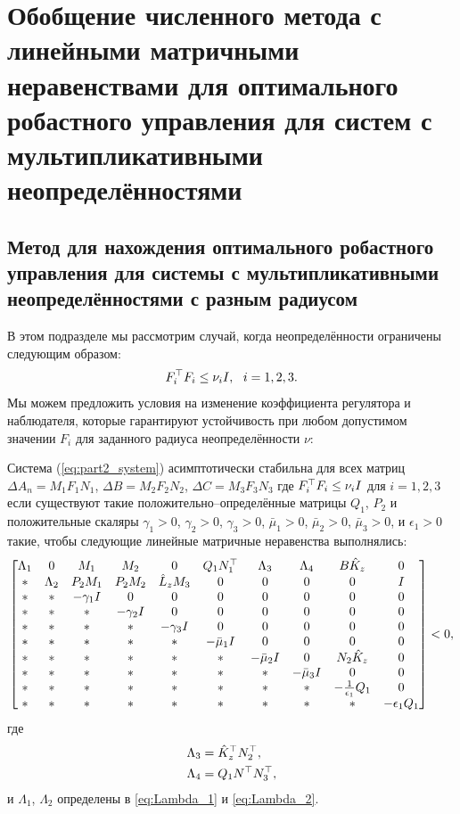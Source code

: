 \chapter{Обобщение численного метода с линейными матричными неравенствами для оптимального робастного управления для систем с мультипликативными неопределённостями}\label{ch:ch4}
\section{Метод для нахождения оптимального робастного управления для системы с мультипликативными неопределённостями с разным радиусом}\label{sec:ch4/sect1}

В этом подразделе мы рассмотрим случай, когда неопределённости ограничены следующим образом:
%
\begin{equation}
	\label{eq:part2_nu_uncertainty}
	{F}_i^\top{F}_i\leq \nu_i {I}, \ \ i=1,2,3.
\end{equation}
%
Мы можем предложить условия на изменение коэффициента регулятора и наблюдателя, которые гарантируют устойчивость при любом допустимом значении ${F}_i$ для заданного радиуса неопределённости $\nu$:
\begin{theorem}\label{thm:part2_LMI_2}
	Система (\ref{eq:part2_system}) асимптотически стабильна для всех матриц
	$\Delta {A}_n={M}_1{F}_1{N}_1$, 
	$\Delta {B}= {M}_2{F}_2{N}_2$, 
	$\Delta {C} = {M}_3{F}_3{N}_3$
	где
	${F}_i^\top{F}_i\leq \nu_i {I}$ для $i=1,2,3$
	если существуют такие положительно--определённые матрицы ${Q}_1$, ${P}_2$ и положительные скаляры
	$\gamma_1>0$, $\gamma_2>0$, $\gamma_3>0$, $\bar{\mu}_1>0$, $\bar{\mu}_2>0$, $\bar{\mu}_3>0$, и $\epsilon_1 > 0$ такие, чтобы следующие линейные матричные неравенства выполнялись:
	\begin{equation}
		\label{eq:thm4_final_LMI}
		\begin{bmatrix}
			{\Lambda}_1 & 0 & {M}_1 & {M}_2&0 & {Q}_1{N}_1^\top & {\Lambda}_3 &{\Lambda}_4 & {B}\hat{{K}}_z & 0\\
			* & {\Lambda}_2 & {P}_2{M}_1 & {P}_2{M}_2 & \hat{{L}}_z{M}_3& 0& 0&0&0&{I} \\
			* & * & -\gamma_1{I} & 0&0&0&0&0&0&0\\
			* & * &*  & -\gamma_2{I}&0&0&0&0&0&0\\
			*& * & * &*  & -\gamma_3{I}&0&0&0&0&0\\
			* &* & * & * & *&-\bar{\mu}_1{I}&0&0&0&0\\
			* & * & * &*& *&*&-\bar{\mu}_2{I}& 0&{N}_2\hat{{K}}_z&0\\
			*&*&* &* & * & * & *&-\bar{\mu}_3{I}&0&0\\
			* & * & *&*&* & *&*&*&-\frac{1}{\epsilon_1}{Q}_1&0\\
			* & * & * & *&*&*&*&*&*&-\epsilon_1{Q}_1\\
		\end{bmatrix}<0,
	\end{equation}
	где
	\begin{align}
		{\Lambda}_3&=\hat{{K}}_z^\top{N}_2^\top,\\ {\Lambda}_4&={Q}_1{N}^\top{N}_3^\top,
	\end{align}
	и ${\Lambda}_1$, ${\Lambda}_2$ определены в \eqref{eq:Lambda_1} и \eqref{eq:Lambda_2}. 
\end{theorem}
